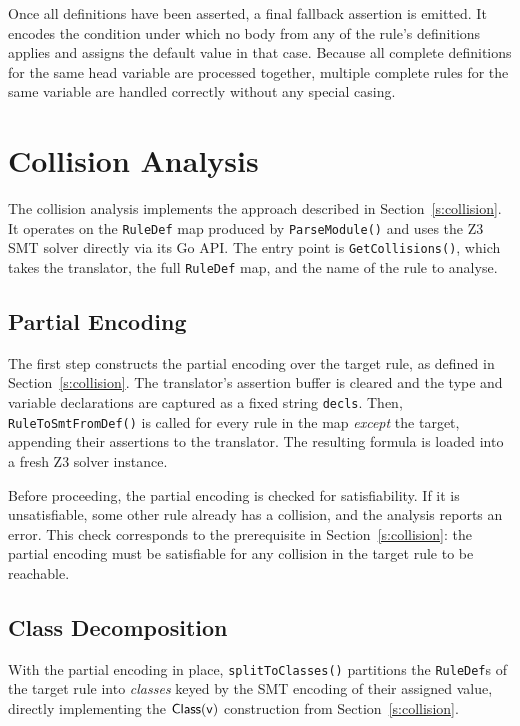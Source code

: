 Once all definitions have been asserted, a final fallback assertion is emitted.
It encodes the condition under which no body from any of the rule's definitions applies
and assigns the default value in that case.
Because all complete definitions for the same head variable are processed together,
multiple complete rules for the same variable are handled correctly without any special
casing.

\section{Collision Analysis}
\label{s:impl:collision}

The collision analysis implements the approach described in Section~\ref{s:collision}.
It operates on the \texttt{RuleDef} map produced by \texttt{ParseModule()} and uses
the Z3 SMT solver directly via its Go API\@.
The entry point is \texttt{GetCollisions()}, which takes the translator, the full
\texttt{RuleDef} map, and the name of the rule to analyse.

\subsection{Partial Encoding}
\label{ss:impl:collision:partial}

The first step constructs the partial encoding over the target rule, as defined in
Section~\ref{s:collision}.
The translator's assertion buffer is cleared and the type and variable declarations are
captured as a fixed string \texttt{decls}.
Then, \texttt{RuleToSmtFromDef()} is called for every rule in the map \emph{except} the
target, appending their assertions to the translator.
The resulting formula is loaded into a fresh Z3 solver instance.

Before proceeding, the partial encoding is checked for satisfiability.
If it is unsatisfiable, some other rule already has a collision, and the analysis reports
an error.
This check corresponds to the prerequisite in Section~\ref{s:collision}: the partial
encoding must be satisfiable for any collision in the target rule to be reachable.

\subsection{Class Decomposition}
\label{ss:impl:collision:classes}

With the partial encoding in place, \texttt{splitToClasses()} partitions the
\texttt{RuleDef}s of the target rule into \emph{classes} keyed by the SMT encoding of
their assigned value, directly implementing the $\mathsf{Class(v)}$ construction from
Section~\ref{s:collision}.

